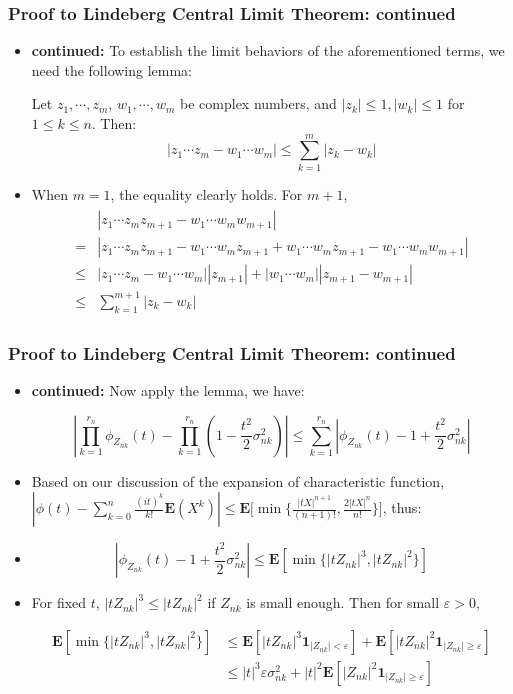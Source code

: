 \documentclass[handout]{beamer}
\newcommand{\BE}{\mathbf{E}}
\newcommand{\BI}{\mathbf{1}}
\begin{document}
 
      \frame
{
  \frametitle{Proof to Lindeberg Central Limit Theorem: continued}
   \begin{itemize}

\item<1->\textbf{continued:} To establish the limit behaviors of the aforementioned terms, we need the following lemma: 
 \begin{Lemma} Let $z_1, \cdots, z_m$, $w_1, \cdots, w_m$ be complex numbers, and $|z_k|\leq 1, |w_k|\leq 1$ for $1\leq k\leq n$. Then: $$|z_1\cdots z_m-w_1\cdots w_m|\leq \sum_{k=1}^m |z_k-w_k|$$
\end{Lemma}

\item<2->[-] When $m=1$, the equality clearly holds. For $m+1$, 
\begin{gather}
\begin{align*}& |z_1\cdots z_mz_{m+1}-w_1\cdots w_m w_{m+1}| \\  = & |z_1\cdots z_mz_{m+1}-w_1\cdots w_m z_{m+1}+ w_1\cdots w_m z_{m+1}-w_1\cdots w_m w_{m+1}| \\ \leq & |z_1\cdots z_m-w_1\cdots w_m| |z_{m+1}|+|w_1\cdots w_m| |z_{m+1}-w_{m+1}| \\  \leq & \sum_{k=1}^{m+1} |z_k-w_k|\end{align*}
\end{gather}

\end{itemize}
}




 
      \frame
{
  \frametitle{Proof to Lindeberg Central Limit Theorem: continued}
   \begin{itemize}

\item<1->\textbf{continued:}  Now apply the lemma, we have:

$$|\prod_{k=1}^{r_n} \phi_{Z_{nk}}(t)-\prod_{k=1}^{r_n} (1-\frac{t^2}{2} \sigma^2_{nk})| \leq \sum_{k=1}^{r_n} | \phi_{Z_{nk}}(t)-1+\frac{t^2}{2} \sigma^2_{nk} |$$
\item<2->[-] Based on our discussion of the expansion of characteristic function,  $|\phi(t) -\sum_{k=0}^n \frac{(it)^k}{k!} \BE(X^k) | \leq  \BE \big [ \min \{ \frac{|tX|^{n+1}}{(n+1)!},  \frac{2|tX|^{n}}{n!} \} \big]$, thus:
\item<3->[] $$|\phi_{Z_{nk}}(t)-1+\frac{t^2}{2} \sigma^2_{nk} | \leq \BE[\min \{|tZ_{nk}|^3, |tZ_{nk}|^2\}]$$

\item<4->[-] For fixed $t$, $|tZ_{nk}|^3\leq |tZ_{nk}|^2$ if $Z_{nk}$ is small enough. Then for small $\varepsilon>0$,

\begin{align*}\BE[\min \{|tZ_{nk}|^3, |tZ_{nk}|^2\}] &\le \BE[|tZ_{nk}|^3\BI_{|Z_{nk}|< \varepsilon}]+\BE[|tZ_{nk}|^2 \BI_{|Z_{nk}|  \geq \varepsilon}] \\ & \leq |t|^3\varepsilon \sigma_{nk}^2+ |t|^2 \BE[|Z_{nk}|^2 \BI_{|Z_{nk}|\geq \varepsilon}] 
\end{align*}

\end{itemize}
}
\end{document}
